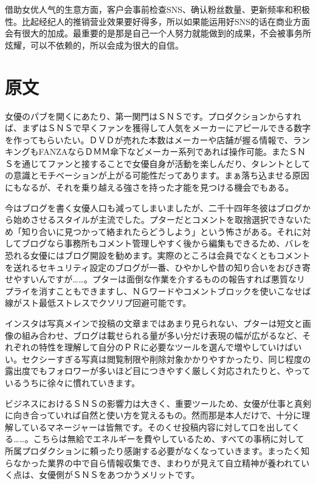 \documentclass[12pt,UTF8]{ctexbook}
\begin{document}
借助女优人气的生意方面，客户会事前检查SNS、确认粉丝数量、更新频率和积极性。比起经纪人的推销营业效果要好得多，所以如果能运用好SNS的话在商业方面会有很大的加成。最重要的是那是自己一个人努力就能做到的成果，不会被事务所炫耀，可以不依赖的，所以会成为很大的自信。



\section*{原文}

女優のパブを開くにあたり、第一関門はＳＮＳです。プロダクションからすれば、まずはＳＮＳで早くファンを獲得して人気をメーカーにアピールできる数字を作ってもらいたい。ＤＶＤが売れた本数はメーカーや店舗が握る情報で、ランキングもFANZAならＤＭＭ傘下などメーカー系列であれば操作可能。またＳＮＳを通じてファンと接することで女優自身が活動を楽しんだり、タレントとしての意識とモチベーションが上がる可能性だってあります。まぁ落ち込ませる原因にもなるが、それを乗り越える強さを持った才能を見つける機会でもある。

今はブログを書く女優人口も減ってしまいましたが、二千十四年冬彼はブログから始めさせるスタイルが主流でした。プターだとコメントを取捨選択できないため「知り合いに見つかって絡まれたらどうしよう」という怖さがある。それに対してブログなら事務所もコメント管理しやすく後から編集もできるため、バレを恐れる女優にはブログ開設を勧めます。実際のところは会員でなくともコメントを送れるセキュリティ設定のブログが一番、ひやかしや昔の知り合いをおびき寄せやすいんですが……。プターは面倒な作業を介するものの報告すれば悪質なリプライを消すこともできますし、ＮＧワードやコメントブロックを使いこなせば線がスト最低ストレスでクソリプ回避可能です。

インスタは写真メインで投稿の文章まではあまり見られない、プターは短文と画像の組み合わせ、ブログは載せられる量が多い分だけ表現の幅が広がるなど、それぞれの特性を理解して自分のＰＲに必要なツールを選んで増やしていけばいい。セクシーすぎる写真は閲覧制限や削除対象かかりやすかったり、同じ程度の露出度でもフォロワーが多いほど目につきやすく厳しく対応されたりと、やっているうちに徐々に慣れていきます。

ビジネスにおけるＳＮＳの影響力は大きく、重要ツールため、女優が仕事と真剣に向き合っていれば自然と使い方を覚えるもの。然而那是本人だけで、十分に理解しているマネージャーは皆無です。そのくせ投稿内容に対して口を出してくる……。こちらは無給でエネルギーを費やしているため、すべての事柄に対して所属プロダクションに頼ったり感謝する必要がなくなっていきます。まったく知らなかった業界の中で自ら情報収集でき、まわりが見えて自立精神が養われていく点は、女優側がＳＮＳをあつかうメリットです。
\end{document}
